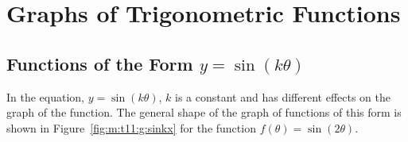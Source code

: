 
\section{Graphs of Trigonometric Functions}

\subsection{Functions of the Form $y=\sin(k\theta)$}
In the equation, $y=\sin(k\theta)$, $k$ is a constant and has different effects on the graph of the function. The general shape of the graph of functions of this form is shown in Figure~\ref{fig:m:t11:g:sinkx} for the function $f(\theta)=\sin(2\theta)$.

